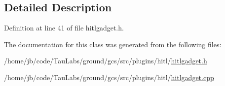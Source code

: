 \subsection{\-Detailed \-Description}


\-Definition at line 41 of file hitlgadget.\-h.



\-The documentation for this class was generated from the following files\-:\begin{DoxyCompactItemize}
\item 
/home/jb/code/\-Tau\-Labs/ground/gcs/src/plugins/hitl/\hyperlink{hitlgadget_8h}{hitlgadget.\-h}\item 
/home/jb/code/\-Tau\-Labs/ground/gcs/src/plugins/hitl/\hyperlink{hitlgadget_8cpp}{hitlgadget.\-cpp}\end{DoxyCompactItemize}

